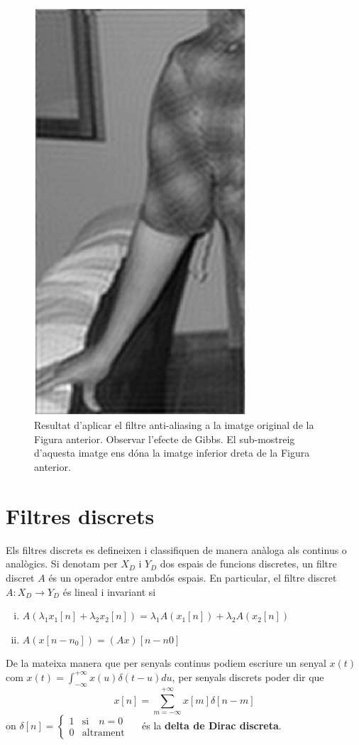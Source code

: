 \documentclass{article}
\begin{document}
\begin{figure}[htbp]
\begin{center}
\includegraphics[width=8cm]{imatges/camisaF.eps}
\caption{Resultat d'aplicar el filtre anti-aliasing a la imatge original 
de la Figura anterior. Observar l'efecte de Gibbs. El sub-mostreig d'aquesta 
imatge ens d\'ona la imatge inferior dreta de la Figura anterior.}
\label{figgibbs}
\end{center}
\end{figure}
 
 
\section{Filtres discrets}
Els filtres discrets es defineixen i classifiquen de manera an\`aloga als 
continus o anal\`ogics. Si denotam per $X_D$ i $Y_D$ dos espais de funcions discretes,
un filtre discret $A$ \'es un operador entre ambd\'os espais.
En particular, el filtre discret $A:X_D \rightarrow Y_D$
\'es lineal i invariant si
\begin{enumerate}[i)]
\item $A(\lambda_1 x_1[n] + \lambda_2 x_2[n])=\lambda_1 A(x_1[n]) + \lambda_2 A(x_2[n])$
\item $A(x[n-n_0])=(Ax)[n-n0]$
\end{enumerate}
De la mateixa manera que per senyals continus podiem escriure un senyal $x(t)$ com
$x(t)=\int_{-\infty}^{+\infty} x(u) \delta(t-u) du$, per senyals discrets poder dir
que
\[
x[n]=\sum_{m=-\infty}^{+\infty} x[m] \delta[n-m]
\]
\noindent
on $\delta[n]=\begin{cases} 1 & \mathrm{si} \quad n=0\\ 0 & \mathrm{altrament}
\end{cases} \quad$ \'es la {\bf delta de Dirac discreta}.
\end{document}
